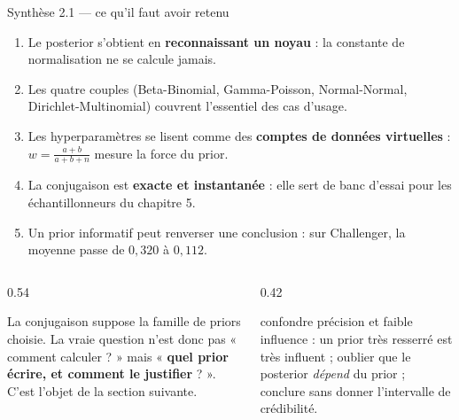 \begin{frame}{Synthèse 2.1 — ce qu'il faut avoir retenu}
\footnotesize
\begin{kbox}
\begin{enumerate}
  \item Le posterior s'obtient en \textbf{reconnaissant un noyau} : la constante de
        normalisation ne se calcule jamais.
  \item Les quatre couples (Beta-Binomial, Gamma-Poisson, Normal-Normal,
        Dirichlet-Multinomial) couvrent l'essentiel des cas d'usage.
  \item Les hyperparamètres se lisent comme des \textbf{comptes de données
        virtuelles} : $w = \frac{a+b}{a+b+n}$ mesure la force du prior.
  \item La conjugaison est \textbf{exacte et instantanée} : elle sert de banc
        d'essai pour les échantillonneurs du chapitre 5.
  \item Un prior informatif peut renverser une conclusion : sur Challenger, la
        moyenne passe de $0{,}320$ à $0{,}112$.
\end{enumerate}
\end{kbox}
\vspace{-2mm}
\begin{columns}[t]
\begin{column}{0.54\textwidth}
\begin{ebox}
La conjugaison suppose la famille de priors choisie. La vraie question n'est donc
pas « comment calculer ? » mais « \textbf{quel prior écrire, et comment le
justifier} ? ». C'est l'objet de la section suivante.
\end{ebox}
\end{column}
\begin{column}{0.42\textwidth}
\begin{wbox}
\warn{} confondre précision et faible influence : un prior très resserré est très
influent ; \;
\warn{} oublier que le posterior \emph{dépend} du prior ; \;
\warn{} conclure sans donner l'intervalle de crédibilité.
\end{wbox}
\end{column}
\end{columns}
\end{frame}
